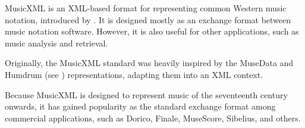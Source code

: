 


MusicXML is an XML-based format for representing common
Western music notation, introduced by
\textcite{good2001musicxml}. It is designed mostly as an
exchange format between music notation software. However, it
is also useful for other applications, such as music
analysis and retrieval.

Originally, the MusicXML standard was heavily inspired by
the MuseData and Humdrum (see
) representations, adapting
them into an XML context.



Because MusicXML is designed to represent music of the
seventeenth century onwards, it has gained popularity as the
standard exchange format among commercial applications, such
as Dorico,
Finale,
MuseScore,
Sibelius, and
others.


